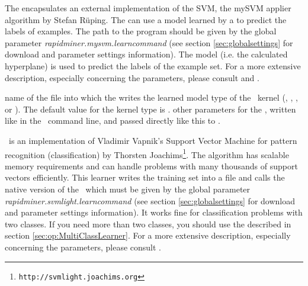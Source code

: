 \opdescr The  encapsulates an external implementation of the 
SVM, the mySVM applier algorithm by Stefan R\"uping. 
   The  can use a model learned by a  to predict
the labels of examples.
   The path to the program should be given by the global parameter 
{\em rapidminer.mysvm.learncommand} (see section \ref{sec:globalsettings} for 
download and parameter settings information). 
   The model (i.e. the calculated hyperplane) is used to predict the labels
of the example set. For a more extensive description, especially concerning
the parameters, please consult \cite{Rueping/2000a} and \cite{Vapnik/98a}.





\learnerio

\begin{parameters}
 name of the file into which the  writes the learned model
 type of the \SVMlight\ kernel
(, 
, 
, or
). 
The default value for the kernel type is
.
 other parameters for the \SVMlight,
written like in the \SVMlight\ command line, and passed directly like this to \SVMlight.
\end{parameters}

\opdescr \SVMlight\ is an implementation of Vladimir Vapnik's Support Vector Machine\cite{Vapnik/98a} for
pattern recognition (classification) by Thorsten Joachims\footnote{\texttt{http://svmlight.joachims.org}}.
The algorithm has scalable memory requirements and can handle problems with many thousands of support vectors efficiently.  
This learner writes the training set into a file and calls the native version of the \SVMlight\
which must be given by the global parameter {\em rapidminer.svmlight.learncommand} 
(see section \ref{sec:globalsettings} for download and parameter settings information). 
It works fine for classification problems with two classes. If you need
more than two classes, you should use the \op{MultiClassLearner} described in section 
\ref{sec:op:MultiClassLearner}. For a more extensive description,
especially concerning the parameters, please consult \cite{Joachims/99a}.





